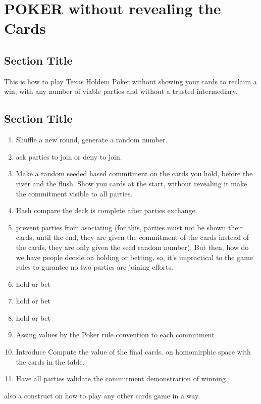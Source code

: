 \chapter{POKER without revealing the Cards}

\section{Section Title}
This is how to play Texas Holdem Poker without showing your cards to reclaim a win, 
with any number of viable parties and without a trusted intermediary. 

\section{Section Title}
\begin{enumerate}
    \item Shuffle a new round, generate a random number. 
    \item ask parties to join or deny to join. 
    \item Make a random seeded hased commitment on the cards you hold, before the river and the flush. 
        \scriptsize{Show you cards at the start, without revealing it} make the commitment visible to all parties. 
    \item Hash compare the deck is complete after parties exchange. 
    \item prevent parties from asociating 
    (for this, parties must not be shown their cards, until the end, they are given the commitment of the 
    cards instead of the cards, they are only given the seed random number). But then, how do we 
    have people decide on holding or betting, so, it's impractical to the game rules to gurantee 
    no two parties are joining efforts. 
    \item hold or bet
    \item hold or bet
    \item hold or bet
    \item Assing values by the Poker rule convention to each commitment
    \item Introduce Compute the value of the final cards. on homomirphic space with the cards in the table. 
    \item Have all parties validate the commitment demonstration of winning. 
\end{enumerate}


also a construct on how to play any other cards game in a way. 

